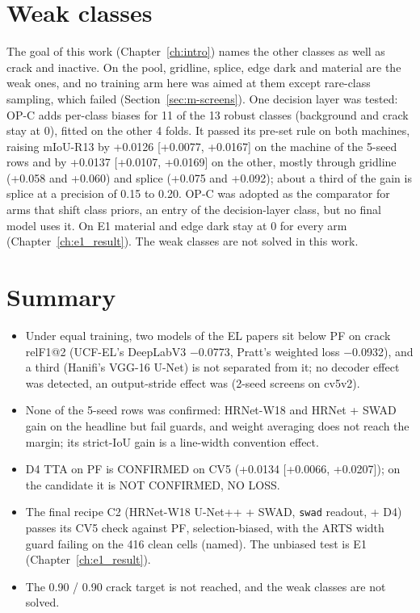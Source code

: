 \section{Weak classes}\label{sec:m-weak}

The goal of this work (Chapter~\ref{ch:intro}) names the other classes as well as crack and inactive. On the pool, gridline, splice, edge dark and material are
the weak ones, and no training arm here was aimed at them except rare-class sampling, which failed
(Section~\ref{sec:m-screens}). One decision layer was tested: OP-C adds per-class biases for 11 of the 13 robust classes
(background and crack stay at 0), fitted on the other 4 folds. It passed its pre-set rule on both machines, raising mIoU-R13 by
+0.0126 [+0.0077, +0.0167] on the machine of the 5-seed rows and by +0.0137 [+0.0107, +0.0169] on the other, mostly through
gridline (+0.058 and +0.060) and splice (+0.075 and +0.092); about a third of the gain is splice at a precision of 0.15 to 0.20.
OP-C was adopted as the comparator for arms that shift class priors, an entry of the decision-layer class, but no final model
uses it. On E1 material and edge dark stay at 0 for every arm (Chapter~\ref{ch:e1_result}). The weak classes are not solved in
this work.

\section{Summary}\label{sec:m-summary}

\begin{itemize}
  \item Under equal training, two models of the EL papers sit below PF on crack relF1@2 (UCF-EL's DeepLabV3 $-$0.0773, Pratt's
  weighted loss $-$0.0932), and a third (Hanifi's VGG-16 U-Net) is not separated from it; no decoder effect was detected, an output-stride effect was (2-seed screens on cv5v2).
  \item None of the 5-seed rows was confirmed: HRNet-W18 and HRNet + SWAD gain on the headline but fail
  guards, and weight averaging does not reach the margin; its strict-IoU gain is a line-width convention effect.
  \item D4 TTA on PF is CONFIRMED on CV5 (+0.0134 [+0.0066, +0.0207]); on the candidate it is NOT CONFIRMED, NO LOSS.
  \item The final recipe C2 (HRNet-W18 U-Net++ + SWAD, \texttt{swad} readout, + D4) passes its CV5 check against PF,
  selection-biased, with the ARTS width guard failing on the 416 clean cells (named). The unbiased test is E1
  (Chapter~\ref{ch:e1_result}).
  \item The 0.90 / 0.90 crack target is not reached, and the weak classes are not solved.
\end{itemize}
